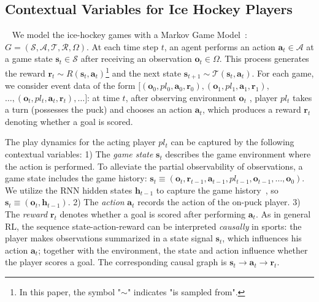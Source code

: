 \documentclass[letterpaper]{article} %
\newcommand{\hiddenstate}{\mathbf{h}}
\newcommand{\state}{\mathbf{s}}
\newcommand{\action}{\mathbf{a}}
\newcommand{\reward}{\boldsymbol{r}}
\newcommand{\player}{pl}
\newcommand{\observation}{\boldsymbol{o}}
\begin{document}
\subsection{Contextual Variables for Ice Hockey Players}~\label{sec:context-nhl}
We model the ice-hockey games with a Markov Game Model~\cite{Littman1994}: $G=(\mathcal{S}, \mathcal{A}, \mathcal{T}, \mathcal{R}, \Omega)$. 
At each time step $t$, an agent performs an action $\action_{t} \in \mathcal{A}$ at a game state $\state_{t} \in \mathcal{S}$ after receiving an observation $\observation_{t} \in \Omega$. 
This process generates the reward
$\reward_{t} \sim R(\state_t, \action_t)$\footnote{In this paper, the symbol "$\sim$" indicates "is sampled from".} and the next state $\state_{t+1} \sim \mathcal{T}(\state_t, \action_t)$.
For each game, we consider event data of the form $[(\observation_0,\player_0,\action_0,\reward_0),(\observation_1,\player_1,\action_1,\reward_1),$ $\ldots,(\observation_{t},\player_{t},\action_{t},\reward_{t}),\ldots]$:
at time $t$, after observing environment $\observation_{t}$
, player $\player_{t}$ takes a turn (possesses the puck) and chooses an action $\action_{t}$, which produces a reward $\reward_{t}$ denoting whether a goal is scored.

The play dynamics for the acting player $\player_{t}$ can be captured by the following contextual variables:
1) The {\it game state} $\state_{t}$ describes the game environment where the action is performed. 
To alleviate the partial observability of observations, a game state includes the game history: $\state_{t} \equiv (\observation_t, \reward_{t-1},\action_{t-1},\player_{t-1},\observation_{t-1},\ldots,\observation_{0})$. We utilize the RNN hidden states $\hiddenstate_{t-1}$ to capture the game history~\cite{littlestone}, so $\state_t \equiv (\observation_{t},\hiddenstate_{t-1})$.
2) The {\it action} $\action_t$ records the action of the on-puck player. 3) The {\it reward} $\reward_{t}$ denotes whether a goal is scored after performing $\action_t$. As in general RL, the sequence state-action-reward can be interpreted {\em causally} in sports: the player makes observations summarized in a state signal $\state_t$, which influences his action $\action_t$; together with the environment, the state and action influence whether the player scores a goal. The corresponding causal graph is $\state_{t}\rightarrow \action_{t}\rightarrow\reward_{t}$. 
\end{document}
